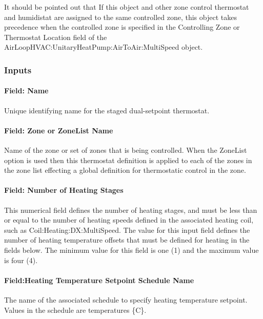It should be pointed out that If this object and other zone control thermostat and humidistat are assigned to the same controlled zone, this object takes precedence when the controlled zone is specified in the Controlling Zone or Thermostat Location field of the AirLoopHVAC:UnitaryHeatPump:AirToAir:MultiSpeed object.

\subsubsection{Inputs}\label{inputs-7-030}

\paragraph{Field: Name}\label{field-name-5-028}

Unique identifying name for the staged dual-setpoint thermostat.

\paragraph{Field: Zone or ZoneList Name}\label{field-zone-or-zonelist-name-1-001}

Name of the zone or set of zones that is being controlled. When the ZoneList option is used then this thermostat definition is applied to each of the zones in the zone list effecting a global definition for thermostatic control in the zone.

\paragraph{Field: Number of Heating Stages}\label{field-number-of-heating-stages}

This numerical field defines the number of heating stages, and must be less than or equal to the number of heating speeds defined in the associated heating coil, such as Coil:Heating:DX:MultiSpeed. The value for this input field defines the number of heating temperature offsets that must be defined for heating in the fields below. The minimum value for this field is one (1) and the maximum value is four (4).

\paragraph{Field:Heating Temperature Setpoint Schedule Name}\label{fieldheating-temperature-setpoint-schedule-name}

The name of the associated schedule to specify heating temperature setpoint. Values in the schedule are temperatures \{C\}.

